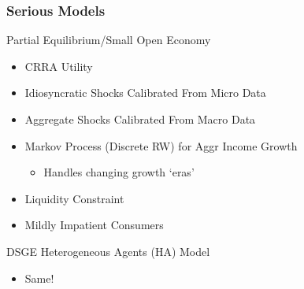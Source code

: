 \documentclass{beamer}\usepackage{dcolumn}
\begin{document}
\begin{frame}
\frametitle{Serious Models}

\begin{block}{Partial Equilibrium/Small Open Economy}
\begin{itemize}
\item  CRRA Utility
\item  Idiosyncratic Shocks Calibrated From Micro Data
\item  Aggregate Shocks Calibrated From Macro Data
\item Markov Process (Discrete RW) for Aggr Income Growth
  \begin{itemize}
  \item Handles changing growth `eras'
  \end{itemize}
\item  Liquidity Constraint
\item  Mildly Impatient Consumers
\end{itemize}
\end{block}

\begin{block}{DSGE Heterogeneous Agents (HA) Model}
\begin{itemize}
\item  Same!
\end{itemize}
\end{block}
\end{frame}
\end{document}
